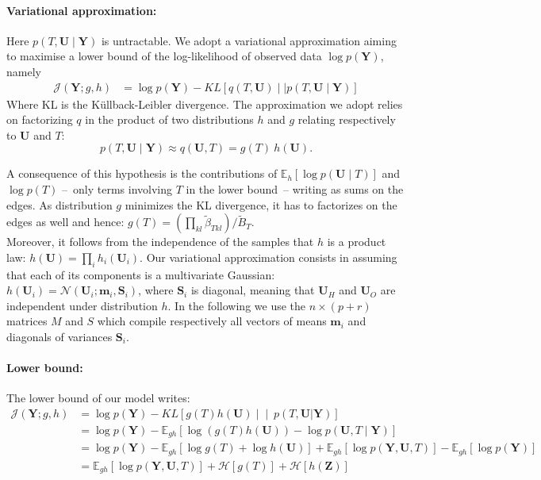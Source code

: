 \documentclass[11pt,a4paper]{article}
\newcommand{\entr}{\mathcal{H}}
\newcommand{\Ybf}{\boldsymbol{Y}}
\newcommand{\Zbf}{\boldsymbol{Z}}
\newcommand{\Ubf}{\boldsymbol{U}}
\newcommand{\Sbf}{\boldsymbol{S}}
\newcommand{\mbf}{\boldsymbol{m}}
\newcommand\Ncal{\mathcal{N}}
\newcommand{\Esp}{\mathds{E}}
\begin{document}
\paragraph{Variational approximation:}

Here $p(T,\Ubf \mid \Ybf)$ is untractable. We adopt a variational approximation aiming to maximise a lower bound of the log-likelihood of observed data $\log p(\Ybf)$, namely  
\begin{align*}
    \mathcal{J}(\Ybf; g,h)
    & = \log p(\Ybf) - KL\left[q(T,\Ubf) \mid\mid p(T,\Ubf \mid \Ybf)\right]
\end{align*}
Where KL is the Küllback-Leibler divergence. The approximation we adopt relies on factorizing $q$ in the product of two distributions $h$ and $g$ relating respectively to $\Ubf$  and $T$: 
$$p(T,\Ubf \mid\Ybf) \approx  q(\Ubf,T) = g(T)\:h(\Ubf).$$

 A consequence of this hypothesis is the contributions of   $\Esp_h[\log p(\Ubf\mid T)]$ and $\log p(T)$ --~only terms involving $T$ in the lower bound~-- writing as sums on the edges. As distribution   $g$ minimizes the KL divergence, it has to factorizes on the edges as well and hence:
$ g(T) = \left(\prod_{kl} \widetilde{\beta}_{Tkl} \right) / \widetilde{B}_T$. \\

Moreover, it follows from the independence of the samples that $h$ is a product law: $ h(\Ubf) = \prod_i h_i(\Ubf_i)$. Our variational approximation consists in assuming that each of its components is a multivariate Gaussian: $h(\Ubf_i) = \Ncal(\Ubf_i; \mbf_i, \Sbf_i)$, where $\Sbf_i$ is diagonal, meaning that $\Ubf_H$ and $\Ubf_O$ are independent under distribution $h$.  In the following we use the  $n\times (p+r)$ matrices $M$ and $S$ which compile respectively all vectors of means $\mbf_i$ and diagonals of variances $\Sbf_i$.


\paragraph{Lower bound:}
The lower bound of our model writes:
\begin{align*}
\mathcal{J}(\Ybf; g,h)&=\log p(\Ybf) - KL\left[g(T) h(\Ubf) \middle\vert\middle\vert\ p(T,\Ubf | \Ybf)\right]\\
&= \log p(\Ybf) - \Esp_{gh}[\log( g(T) h(\Ubf)) - \log p(\Ubf,T\mid \Ybf) ]\\
&= \log p(\Ybf) - \Esp_{gh}[\log g(T) + \log h(\Ubf) ] + \Esp_{gh}[\log p(\Ybf,\Ubf,T)] - \Esp_{gh}[\log p(\Ybf)]\\
&= \Esp_{gh} [\log p(\Ybf,\Ubf,T)] + \entr[g(T)] + \entr[h(\Zbf)]
\end{align*}
\end{document}
